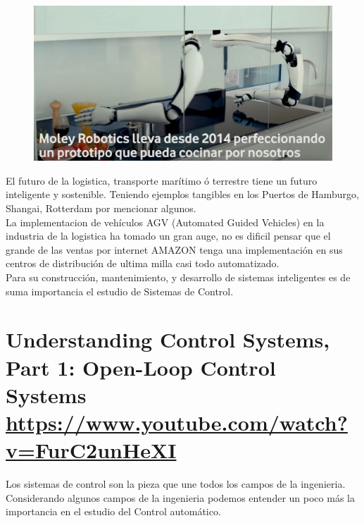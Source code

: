 \documentclass[
	12pt, %
]{fphw}
\begin{document}
\begin{figure}[H]
  \centering
  \includegraphics[scale=0.4]{images/hard.png}
\end{figure}

El futuro de la logistica, transporte marítimo ó terrestre tiene un futuro inteligente y sostenible. Teniendo ejemplos tangibles en los Puertos de Hamburgo, Shangai, Rotterdam por mencionar algunos.\\

La implementacion de vehículos AGV (Automated Guided Vehicles) en la industria de la logistica ha tomado un gran auge, no es dificil pensar que el grande de las ventas por internet AMAZON tenga una implementación en sus centros de distribución de ultima milla casi todo automatizado.\\

Para su construcción, mantenimiento, y desarrollo de sistemas inteligentes es de suma importancia el estudio de Sistemas de Control.

\newpage
\section*{{\color{Apricot}Understanding Control Systems, Part 1: Open-Loop Control Systems} \url{https://www.youtube.com/watch?v=FurC2unHeXI}}

Los sistemas de control son la pieza que une todos los campos de la ingenieria.\\

Considerando algunos campos de la ingenieria podemos entender un poco más la importancia en el estudio del Control automático.
\end{document}
